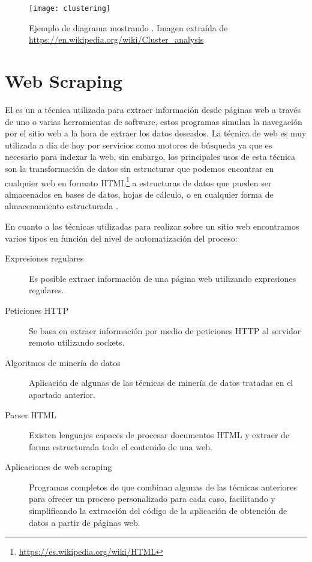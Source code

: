 \begin{description}
    \FloatBarrier
    \begin{figure}[!h]
    \centering
    \texttt{[image: clustering]}
    \caption[Ejemplo de diagrama mostrando ]{Ejemplo de diagrama mostrando .
    \newline
    Imagen extraída de \url{https://en.wikipedia.org/wiki/Cluster\_analysis}}
    \label{fig}
    \end{figure}
    \FloatBarrier
    
\end{description}

\section{Web Scraping}
El  es un a técnica utilizada para extraer información desde páginas web a través de uno o varias herramientas de software, estos programas simulan la navegación por el sitio web a la hora de extraer los datos deseados. La técnica de web  es muy utilizada a día de hoy por servicios como motores de búsqueda ya que es necesario para indexar la web, sin embargo, los principales usos de esta técnica son la transformación de datos sin estructurar que podemos encontrar en cualquier web en formato HTML\footnote{\url{https://es.wikipedia.org/wiki/HTML}} a estructuras de datos que pueden ser almacenados en bases de datos, hojas de cálculo, o en cualquier forma de almacenamiento estructurada \cite{wiki:web_scraping}.

\newpage

En cuanto a las técnicas utilizadas para realizar  sobre un sitio web encontramos varios tipos en función del nivel de automatización del proceso:

\begin{description}
    \item[Expresiones regulares] Es posible extraer información de una página web utilizando expresiones regulares.
    \item[Peticiones HTTP] Se basa en extraer información por medio de peticiones HTTP al servidor remoto utilizando sockets.
    \item[Algoritmos de minería de datos] Aplicación de algunas de las técnicas de minería de datos tratadas en el apartado anterior.
    \item[Parser HTML] Existen lenguajes capaces de procesar documentos HTML y extraer de forma estructurada todo el contenido de una web.
    \item[Aplicaciones de web scraping] Programas completos de  que combinan algunas de las técnicas anteriores para ofrecer un proceso personalizado para cada caso, facilitando y simplificando la extracción del código de la aplicación de obtención de datos a partir de páginas web.
\end{description}